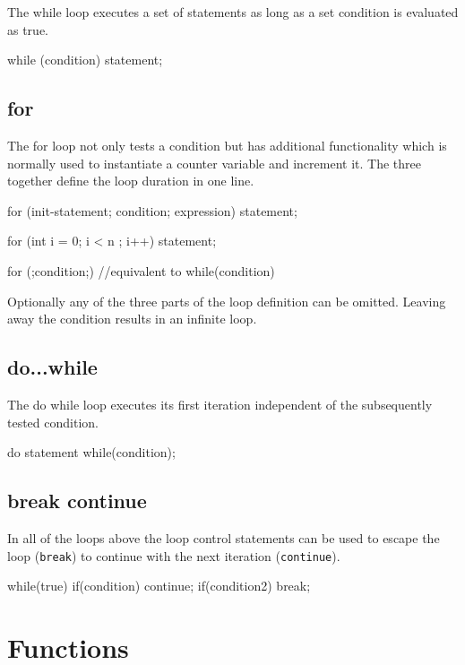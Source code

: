 \documentclass[10pt,a4paper]{scrartcl}
\begin{document}
\begin{multicols*}{2}
The while loop executes a set of statements as long as a set condition is evaluated as true.

\begin{TPCpp}
while (condition) {
	statement;
}
\end{TPCpp}

\subsection{for}
\label{sec:For}

The for loop not only tests a condition but has additional functionality which is normally used to instantiate a counter variable and increment it. The three together define the loop duration in one line.

\begin{TPCpp}
for (init-statement; condition; expression){
	statement;
}

for (int i = 0; i < n ; i++){
	statement;
}

for (;condition;) {
	//equivalent to while(condition)
}
\end{TPCpp}

Optionally any of the three parts of the loop definition can be omitted. Leaving away the condition results in an infinite loop.

\subsection{do...while}
\label{sec:DoWhile}

The do while loop executes its first iteration independent of the subsequently tested condition.

\begin{TPCpp}
do {
	statement
} while(condition);
\end{TPCpp}

\subsection{break continue}
\label{sec:BreakContinue}

In all of the loops above the loop control statements can be used to escape the loop (\verb+break+) to continue with the next iteration (\verb+continue+).

\begin{TPCpp}
while(true){
	if(condition){
		continue;
	}
	if(condition2){
		break;	
	}
}
\end{TPCpp}

\section{Functions}
\label{sec:Functions}


\end{multicols*}
\end{document}
